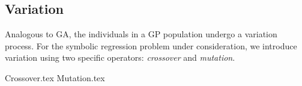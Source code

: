 
\subsection{Variation}
\label{sec:bg:gp:variation}
  Analogous to GA, the individuals in a GP population undergo a variation
  process.
  For the symbolic regression problem under consideration, we introduce
  variation using two specific operators: \emph{crossover} and \emph{mutation}.

  {Crossover.tex}
  {Mutation.tex}
%